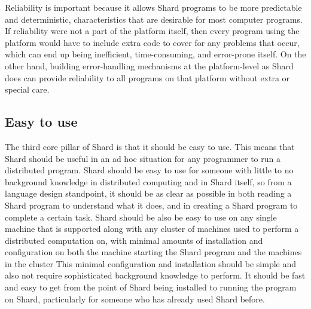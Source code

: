 \documentclass[twoside]{report}
\begin{document}
Reliability is important because it allows Shard programs to be more predictable and deterministic, characteristics that are desirable for most computer programs. If reliability were not a part of the platform itself, then every program using the platform would have to include extra code to cover for any problems that occur, which can end up being inefficient, time-consuming, and error-prone itself. On the other hand, building error-handling mechanisms at the platform-level as Shard does can provide reliability to all programs on that platform without extra or special care.

\subsection{Easy to use}

The third core pillar of Shard is that it should be easy to use.
This means that Shard should be useful in an ad hoc situation for any programmer to run a distributed program.
Shard should be easy to use for someone with little to no background knowledge in distributed computing and in Shard itself, so from a language design standpoint, it should be as clear as possible in both reading a Shard program to understand what it does, and in creating a Shard program to complete a certain task.
Shard should be also be easy to use on any single machine that is supported along with any cluster of machines used to perform a distributed computation on, with minimal amounts of installation and configuration on both the machine starting the Shard program and the machines in the cluster
This minimal configuration and installation should be simple and also not require sophisticated background knowledge to perform.
It should be fast and easy to get from the point of Shard being installed to running the program on Shard, particularly for someone who has already used Shard before.
\end{document}
